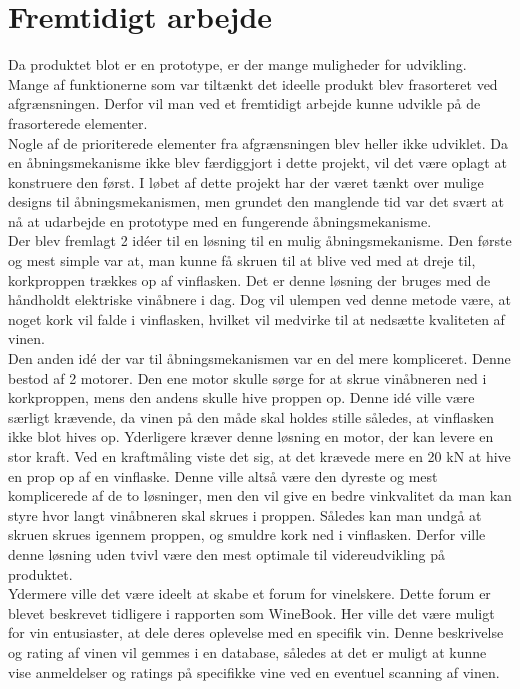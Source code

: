 \chapter{Fremtidigt arbejde}

Da produktet blot er en prototype, er der mange muligheder for udvikling. Mange af funktionerne som var tiltænkt det ideelle produkt blev frasorteret ved afgrænsningen. Derfor vil man ved et fremtidigt arbejde kunne udvikle på de frasorterede elementer.
\\

Nogle af de prioriterede elementer fra afgrænsningen blev heller ikke udviklet. Da en åbningsmekanisme ikke blev færdiggjort i dette projekt, vil det være oplagt at konstruere den først. I løbet af dette projekt har der været tænkt over mulige designs til åbningsmekanismen, men grundet den manglende tid var det svært at nå at udarbejde en prototype med en fungerende åbningsmekanisme. 
\\

Der blev fremlagt 2 idéer til en løsning til en mulig åbningsmekanisme. Den første og mest simple var at, man kunne få skruen til at blive ved med at dreje til, korkproppen trækkes op af vinflasken. Det er denne løsning der bruges med de håndholdt elektriske vinåbnere i dag. Dog vil ulempen ved denne metode være, at noget kork vil falde i vinflasken, hvilket vil medvirke til at nedsætte kvaliteten af vinen.
\\

Den anden idé der var til åbningsmekanismen var en del mere kompliceret. Denne bestod af 2 motorer. Den ene motor skulle sørge for at skrue vinåbneren ned i korkproppen, mens den andens skulle hive proppen op. Denne idé ville være særligt krævende, da vinen på den måde skal holdes stille således, at vinflasken ikke blot hives op. Yderligere kræver denne løsning en motor, der kan levere en stor kraft. Ved en kraftmåling viste det sig, at det krævede mere en 20 kN at hive en prop op af en vinflaske. Denne ville altså være den dyreste og mest komplicerede af de to løsninger, men den vil give en bedre vinkvalitet da man kan styre hvor langt vinåbneren skal skrues i proppen. Således kan man undgå at skruen skrues igennem proppen, og smuldre kork ned i vinflasken. Derfor ville denne løsning uden tvivl være den mest optimale til videreudvikling på produktet.
\\

Ydermere ville det være ideelt at skabe et forum for vinelskere. Dette forum er blevet beskrevet tidligere i rapporten som WineBook. Her ville det være muligt for vin entusiaster, at dele deres oplevelse med en specifik vin. Denne beskrivelse og rating af vinen vil gemmes i en database, således at det er muligt at kunne vise anmeldelser og ratings på specifikke vine ved en eventuel scanning af vinen.
\\

